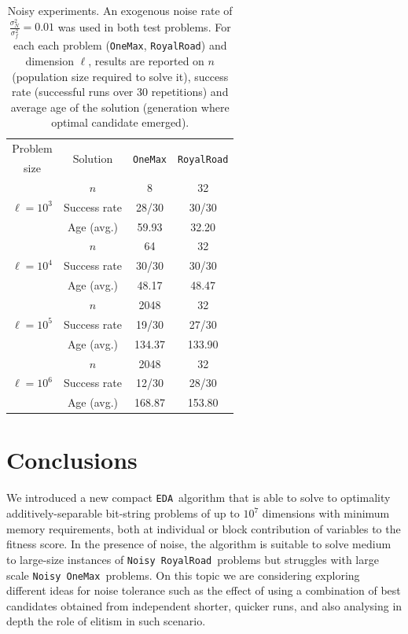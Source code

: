 \documentclass{sig-alternate}
\newcommand{\EDA}{\texttt{EDA}}
\newcommand{\onemax}{\texttt{OneMax}}
\newcommand{\rroad}{\texttt{RoyalRoad}}
\newcommand{\noisy}{\texttt{Noisy~}}
\begin{document}
\begin{table}
	\centering
	{\footnotesize
	\renewcommand{\arraystretch}{1.2}
		\begin{tabular}{|c||c||c||c|}
		\hline
		Problem & \multirow{2}{*}{Solution} & \multirow{2}{*}{\onemax} & \multirow{2}{*}{\rroad} \\ 
		size & & & \\
		\hline
		\hline
		\multirow{3}{*}{$\ell=10^3$} 
		 & $n$ & 8 & 32  \\
		 & Success rate & 28/30 & 30/30 \\
		 & Age (avg.)  & 59.93 & 32.20 \\
		\hline
		\hline
		\multirow{3}{*}{$\ell=10^4$} 
		 & $n$ & 64 & 32  \\
		 & Success rate & 30/30 &  30/30\\
		 & Age (avg.)  & 48.17 & 48.47 \\
		\hline
		\hline
		\multirow{3}{*}{$\ell=10^5$} 
		 & $n$ & 2048 & 32 \\
		 & Success rate & 19/30 & 27/30 \\
		 & Age (avg.)  & 134.37 &  133.90 \\
		\hline
		\hline
		\multirow{3}{*}{$\ell=10^6$} 
		 & $n$ & 2048 & 32  \\
		 & Success rate & 12/30 & 28/30 \\
		 & Age (avg.)  & 168.87 &  153.80 \\
		\hline
		\end{tabular}
	}
	\caption{Noisy experiments. An exogenous noise rate of $\frac{\sigma^2_N}{\sigma^2_f}=0.01$ was used in both test problems. For each each problem (\onemax, \rroad) and dimension $\ell$, results are reported on $n$ (population size required to solve it), success rate (successful runs over 30 repetitions) and average age of the solution (generation where optimal candidate emerged).} 
	\label{tab:results-noisy}		
\end{table}

\section{Conclusions}
\label{sec:conclusion}
We introduced a new compact \EDA~algorithm that is able to solve to optimality additively-separable bit-string problems of up to $10^7$ dimensions with minimum memory requirements, both at individual or block contribution of variables to the fitness score. In the presence of noise, the algorithm is suitable to solve medium to large-size instances of \noisy \rroad~problems but struggles with large scale \noisy\onemax~problems.  On this topic we are considering exploring different ideas for noise tolerance such as the effect of using a combination of best candidates obtained from independent shorter, quicker runs, and also analysing in depth the role of elitism in such scenario.
\end{document}
